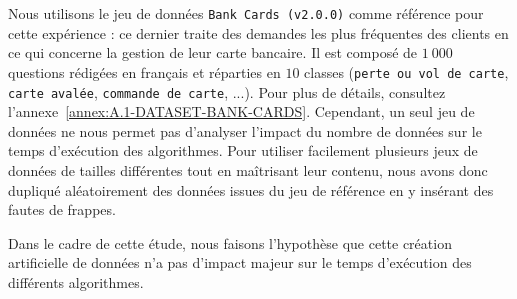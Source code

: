 			Nous utilisons le jeu de données \texttt{Bank Cards (v2.0.0)} comme référence pour cette expérience : ce dernier traite des demandes les plus fréquentes des clients en ce qui concerne la gestion de leur carte bancaire.
			Il est composé de $1~000$ questions rédigées en français et réparties en $10$ classes (\texttt{perte ou vol de carte}, \texttt{carte avalée}, \texttt{commande de carte}, ...).
			Pour plus de détails, consultez l'annexe~\ref{annex:A.1-DATASET-BANK-CARDS}.
			Cependant, un seul jeu de données ne nous permet pas d'analyser l'impact du nombre de données sur le temps d'exécution des algorithmes.
			Pour utiliser facilement plusieurs jeux de données de tailles différentes tout en maîtrisant leur contenu, nous avons donc dupliqué aléatoirement des données issues du jeu de référence en y insérant des fautes de frappes.
			
			\begin{leftBarWarning}
				Dans le cadre de cette étude, nous faisons l'hypothèse que cette création artificielle de données n'a pas d'impact majeur sur le temps d'exécution des différents algorithmes.
			\end{leftBarWarning}
			
